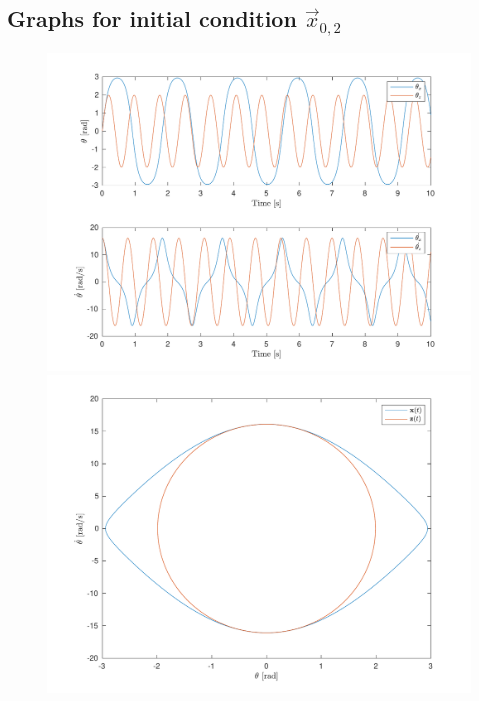 \documentclass[10pt]{article}
\begin{document}
\subsection{Graphs for initial condition $\vec{x}_{0,2}$}
\begin{figure}[ht]
    \centering
    \begin{minipage}[b]{0.45\textwidth}
        \centering
        \includegraphics[width=1\linewidth]{lab1/figs/section5_X0_2_state_evolution.pdf}
    \end{minipage}
    \begin{minipage}[b]{0.45\textwidth}
        \centering
        \includegraphics[width=1\linewidth]{lab1/figs/section5_X0_2_state_orbit.pdf}
    \end{minipage}
    
    \label{figure:x_0_2_state_evolution}
\end{figure}
\end{document}
